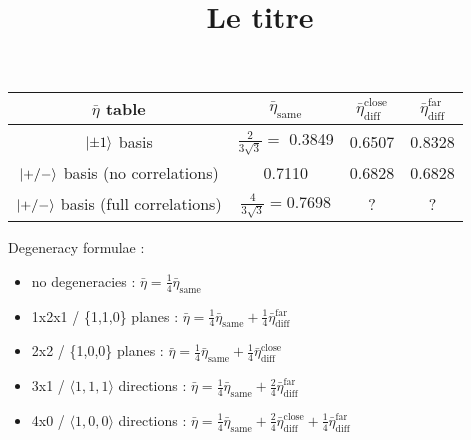 \documentclass[a4paper]{article}
\title{Le titre}
\begin{document}
\centering
\begin{tabular}{cccc}

\hline
$\bar{\eta}$ table & $\bar{\eta}_\textrm{same}$ & $\bar{\eta}_\textrm{diff}^\textrm{close}$ & $\bar{\eta}_\textrm{diff}^\textrm{far}$ \\
\hline
$\ket{\pm 1}$ basis & $\frac{2}{3\sqrt{3}}=$ 0.3849 & 0.6507 & 0.8328 \\
$\ket{+/-}$ basis (no correlations) & 0.7110  & 0.6828 & 0.6828 \\
$\ket{+/-}$ basis (full correlations) & $\frac{4}{3\sqrt{3}}=$0.7698  & ? & ? \\
\hline
\end{tabular}

\bigskip

Degeneracy formulae :
\begin{itemize}
\medskip
\item no degeneracies : $\bar{\eta}=\frac{1}{4}\bar{\eta}_\textrm{same}$
\medskip
\item 1x2x1 / \{1,1,0\} planes : $\bar{\eta}=\frac{1}{4}\bar{\eta}_\textrm{same} + \frac{1}{4}\bar{\eta}_\textrm{diff}^\textrm{far}$
\medskip
\item 2x2 / \{1,0,0\} planes : $\bar{\eta}=\frac{1}{4}\bar{\eta}_\textrm{same} + \frac{1}{4}\bar{\eta}_\textrm{diff}^\textrm{close}$
\medskip
\item 3x1 / $\langle 1,1,1 \rangle$ directions : $\bar{\eta}=\frac{1}{4}\bar{\eta}_\textrm{same} + \frac{2}{4}\bar{\eta}_\textrm{diff}^\textrm{far}$
\medskip
\item 4x0 / $\langle 1,0,0 \rangle$ directions : $\bar{\eta}=\frac{1}{4}\bar{\eta}_\textrm{same} + \frac{2}{4}\bar{\eta}_\textrm{diff}^\textrm{close} + \frac{1}{4}\bar{\eta}_\textrm{diff}^\textrm{far}$
\end{itemize}
\end{document}
